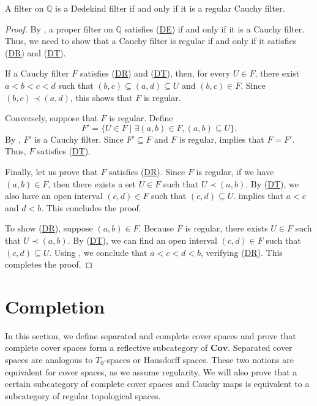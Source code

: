 \documentclass[reqno]{amsart}
\newcommand{\axref}[1]{(\hyperref[ax:#1]{#1})}
\theoremstyle{definition}
\theoremstyle{remark}
\numberwithin{figure}{section}
\newcommand{\rb}{\prec}
\newcommand{\cat}[1]{\mathbf{#1}}
\begin{document}
\begin{prop}
A filter on $\mathbb{Q}$ is a Dedekind filter if and only if it is a regular Cauchy filter.
\end{prop}
\begin{proof}
By , a proper filter on $\mathbb{Q}$ satisfies \axref{DE} if and only if it is a Cauchy filter.  
Thus, we need to show that a Cauchy filter is regular if and only if it satisfies \axref{DR} and \axref{DT}.

If a Cauchy filter $F$ satisfies \axref{DR} and \axref{DT}, then, for every $U \in F$, there exist $a < b < c < d$ such that $(b,c) \subseteq (a,d) \subseteq U$ and $(b,c) \in F$.
Since $(b,c) \rb (a,d)$, this shows that $F$ is regular.

Conversely, suppose that $F$ is regular.
Define
\[ F' = \{ U \in F \mid \exists (a,b) \in F, (a,b) \subseteq U \}. \]
By , $F'$ is a Cauchy filter.  
Since $F' \subseteq F$ and $F$ is regular,  implies that $F = F'$.
Thus, $F$ satisfies \axref{DT}.

Finally, let us prove that $F$ satisfies \axref{DR}.
Since $F$ is regular, if we have $(a,b) \in F$, then there exists a set $U \in F$ such that $U \rb (a,b)$.
By \axref{DT}, we also have an open interval $(c,d) \in F$ such that $(c,d) \subseteq U$.
 implies that $a < c$ and $d < b$.
This concludes the proof.

To show \axref{DR}, suppose $(a,b) \in F$.  
Because $F$ is regular, there exists $U \in F$ such that $U \rb (a,b)$.  
By \axref{DT}, we can find an open interval $(c,d) \in F$ such that $(c,d) \subseteq U$.  
Using , we conclude that $a < c < d < b$, verifying \axref{DR}.  
This completes the proof.  
\end{proof}

\section{Completion}
\label{sec:completion}

In this section, we define separated and complete cover spaces and prove that complete cover spaces form a reflective subcategory of $\cat{Cov}$.
Separated cover spaces are analogous to $T_0$-spaces or Hausdorff spaces.
These two notions are equivalent for cover spaces, as we assume regularity.
We will also prove that a certain subcategory of complete cover spaces and Cauchy maps is equivalent to a subcategory of regular topological spaces.
\end{document}
